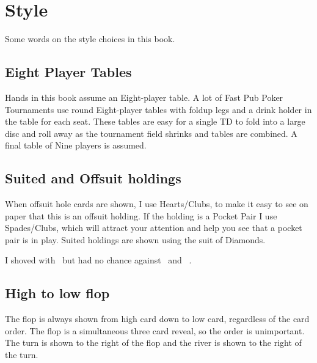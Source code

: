 \chapter{Style}


Some words on the style choices in this book.

\section*{Eight Player Tables}

Hands in this book assume an Eight-player table. A lot of Fast Pub
Poker Tournaments use round Eight-player tables with foldup legs and a
drink holder in the table for each seat. These tables are easy for a
single TD to fold into a large disc and roll away as the tournament
field shrinks and tables are combined. A final table of Nine players
is assumed.

\section*{Suited and Offsuit holdings}

When offsuit hole cards are shown, I use Hearts/Clubs, to make
it easy to see on paper that this is an offsuit holding. If the
holding is a Pocket Pair I use Spades/Clubs, which will
attract your attention and help you see that a pocket pair is in play.
Suited holdings are shown using the suit of Diamonds.

I shoved with \Ah\tenc\ but had no chance against \Ad\Kd\ and \Js\Jc\ .



\section*{High to low flop}

The flop is always shown from high card down to low card,
regardless of the card order. The flop is a simultaneous three card
reveal, so the order is unimportant. The turn is shown to the right of
the flop and the river is shown to the right of the turn.

